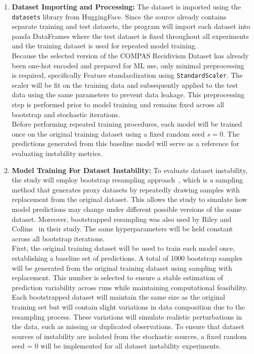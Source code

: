 \documentclass[12pt]{article}
\begin{document}
\begin{enumerate}
  \item \textbf{Dataset Importing and Processing:}
  The dataset is imported using the \texttt{datasets} library from HuggingFace. Since the source already contains separate training and test datasets, the program will import each dataset into panda DataFrames where the test dataset is fixed throughout all experiments and the training dataset is used for repeated model training.\\

  Because the selected version of the COMPAS Recidivism Dataset has already been one-hot encoded and prepared for ML use, only minimal preprocessing is required, specifically Feature standardization using \texttt{StandardScaler}. The scaler will be fit on the training data and subsequently applied to the test data using the same parameters to prevent data leakage. This preprocessing step is performed prior to model training and remains fixed across all bootstrap and stochastic iterations.\\

  Before performing repeated training procedures, each model will be trained once on the original training dataset using a fixed random seed $s = 0$. The predictions generated from this baseline model will serve as a reference for evaluating instability metrics.

  \item \textbf{Model Training For Dataset Instability:}
  To evaluate dataset instability, the study will employ bootstrap resampling approach~\cite{efron2000bootstrap}, which is a sampling method that generates proxy datasets by repeatedly drawing samples with replacement from the original dataset. This allows the study to simulate how model predictions may change under different possible versions of the same dataset. Moreover, bootstrapped resampling was also used by Riley and Collins~\cite{riley2023stability} in their study. The same hyperparameters will be held constant across all bootstrap iterations. \\

  First, the original training dataset will be used to train each model once, establishing a baseline set of predictions. A total of 1000 bootstrap samples will be generated from the original training dataset using sampling with replacement. This number is selected to ensure a stable estimation of prediction variability across runs while maintaining computational feasibility. Each bootstrapped dataset will maintain the same size as the original training set but will contain slight variations in data composition due to the resampling process. These variations will simulate realistic perturbations in the data, such as missing or duplicated observations. To ensure that dataset sources of instability are isolated from the stochastic sources, a fixed random seed = 0 will be implemented for all dataset instability experiments.\\ 


\end{enumerate}
\end{document}
